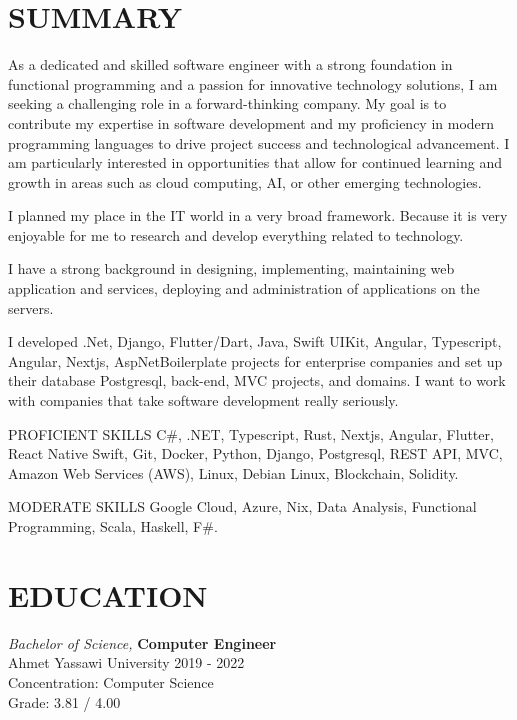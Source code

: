 \documentclass[line,margin]{res}
\begin{document}
\address{emre.yildiz.dev@hotmail.com}
\address{\href{https://linkedin.com/in/emre-yildiz-297ab0242}{https://linkedin.com/in/emre-yildiz-297ab0242}} 


 
\begin{resume}
 
\section{SUMMARY}  As a dedicated and skilled software engineer with a strong foundation in functional programming and a passion for innovative technology solutions, I am seeking a challenging role in a forward-thinking company. My goal is to contribute my expertise in software development and my proficiency in modern programming languages to drive project success and technological advancement. I am particularly interested in opportunities that allow for continued learning and growth in areas such as cloud computing, AI, or other emerging technologies.
                
I planned my place in the IT world in a very broad framework. Because it is very enjoyable for me to research and develop everything related to technology.

I have a strong background in designing, implementing, maintaining web application and services, deploying and administration of applications  on the servers.

I developed .Net, Django, Flutter/Dart, Java, Swift UIKit, Angular, Typescript, Angular, Nextjs, AspNetBoilerplate projects for enterprise companies and set up their database Postgresql, back-end, MVC projects, and domains.
I want to work with companies that take software development really seriously.

PROFICIENT SKILLS
C\#, .NET, Typescript, Rust, Nextjs, Angular, Flutter, React Native Swift, Git, Docker, Python, Django, Postgresql, REST API, MVC, Amazon Web Services (AWS), Linux, Debian Linux, Blockchain, Solidity.

MODERATE SKILLS
Google Cloud, Azure, Nix, Data Analysis, Functional Programming, Scala, Haskell, F\#.
 
 
\section{EDUCATION} {\sl Bachelor of Science,} \textbf{Computer Engineer} \\
                Ahmet Yassawi University 
                2019 - 2022 \\
                Concentration: Computer Science \\
                Grade: 3.81 / 4.00 


\end{resume}
\end{document}
